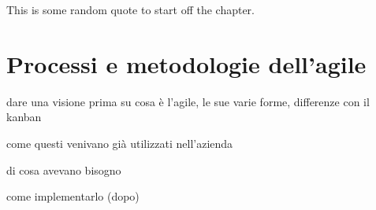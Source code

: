 \begin{savequote}[75mm]
This is some random quote to start off the chapter.
\end{savequote}

\chapter{Processi e metodologie dell'agile}


dare una visione prima su cosa è l'agile, le sue varie forme, differenze con il kanban

come questi venivano già utilizzati nell'azienda

di cosa avevano bisogno

come implementarlo (dopo)




